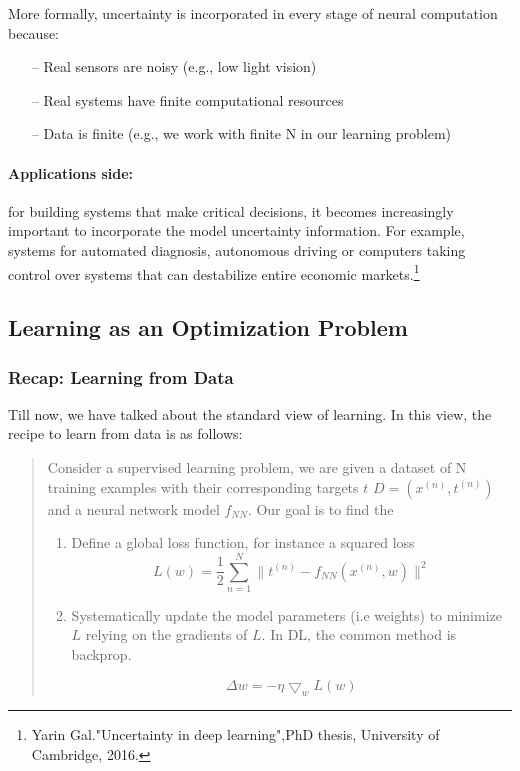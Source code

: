 \documentclass[main]{subfiles}
\begin{document}
    \noindent
    More formally, uncertainty is incorporated in every stage of neural computation because:
    \begin{itemize}
        \item[--] Real sensors are noisy (e.g., low light vision)
        \item[--] Real systems have finite computational resources
        \item[--] Data is finite (e.g., we work with finite N in our learning problem)
    \end{itemize}
    
    \paragraph{Applications side:} for building systems that make critical decisions, it becomes increasingly important to incorporate the model uncertainty information. For example, systems for automated diagnosis, autonomous driving or computers taking control over systems that can destabilize entire economic markets.\footnote{Yarin Gal."Uncertainty in deep learning",PhD thesis, University of Cambridge, 2016.}

\subsection{Learning as an Optimization Problem}
\subsubsection{Recap: Learning from Data}
Till now, we have talked about the standard view of learning. In this view, the recipe to learn from data is as follows:

\begin{quote}
    Consider a supervised learning problem, we are given a dataset of N training examples with their corresponding targets $t$ $D = {(x^{(n)}, t^{(n)})}$ and a neural network model $f_{NN}$. Our goal is to find the 
\begin{enumerate}
    \item Define a global loss function, for instance a squared loss
        \begin{equation}
            L(w) = \frac{1}{2} \sum_{n=1}^{N} \parallel t^{(n)} - f_{NN}(x^{(n)},w) \parallel^2
        \end{equation}
    \item Systematically update the model parameters (i.e weights) to minimize $L$ relying on the gradients of $L$. In DL, the common method is backprop.
    
        \begin{equation}
            \Delta w = -\eta \bigtriangledown_w L(w)
        \end{equation}
    
\end{enumerate}
\end{quote}
\end{document}
